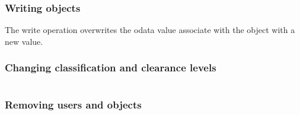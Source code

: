 \documentclass{beamer}
\begin{document}
\begin{frame}
\frametitle{Writing objects}


    The write operation overwrites the odata value associate with
    the object with a new value.
\end{frame}




\begin{frame}
\frametitle{Changing classification and clearance levels}

\begin{columns}
\begin{column}{2in}
\end{column}
\begin{column}{2in}
\end{column}
\end{columns}



\end{frame}




\begin{frame}

\frametitle{Removing users and objects}

\begin{columns}
\begin{column}{2in}
\end{column}
\begin{column}{2in}
\pause
\end{column}
\end{columns}


\end{frame}
\end{document}
